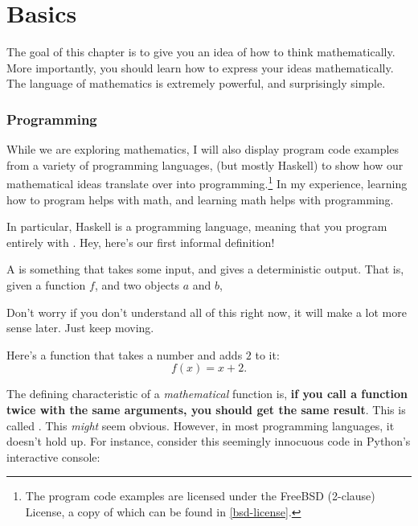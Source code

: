 \chapter{Basics}
\label{basics}

 The goal of this chapter
is to give you an idea of how to think mathematically. More
importantly, you should learn how to express your ideas
mathematically. The language of mathematics is extremely powerful, and
surprisingly simple.


\subsection{Programming}

While we are exploring mathematics, I will also display program code
examples from a variety of programming languages, (but mostly Haskell)
to show how our mathematical ideas translate over into
programming.\footnote{The program code examples are licensed under the
  FreeBSD (2-clause) License, a copy of which can be found in
  \cref{bsd-license}.} In my experience, learning how to program helps
with math, and learning math helps with programming.

In particular, Haskell is a  programming language,
meaning that you program entirely with . Hey, here's our first informal definition!

\begin{definition}
  A  is something that takes some input,
  and gives a deterministic output. That is, given a function $f$, and
  two objects $a$ and $b$, 
\end{definition}

Don't worry if you don't understand all of this right now, it will
make a lot more sense later. Just keep moving.

\begin{example}
  Here's a function that takes a number and adds $2$ to it: $$f(x) =
  x + 2.$$
\end{example}

The defining characteristic of a \emph{mathematical} function is,
\textbf{if you call a function twice with the same arguments, you
  should get the same result}. This is called .  This \emph{might} seem obvious. However, in most
programming languages, it doesn't hold up. For instance, consider this
seemingly innocuous code in Python's interactive console:


